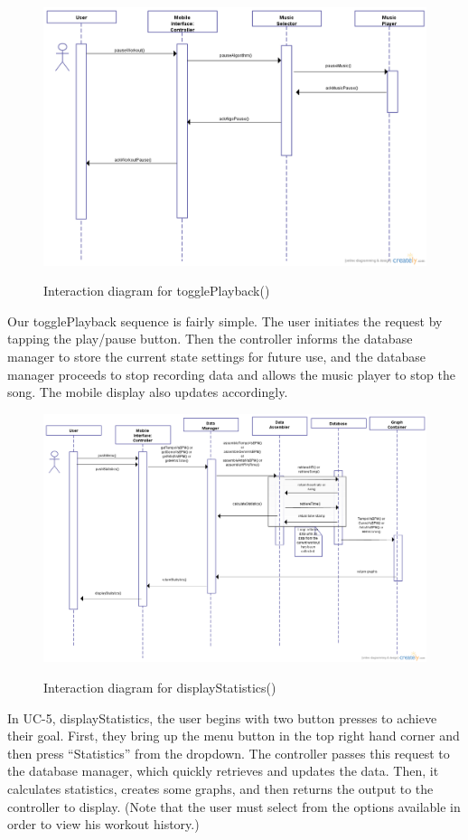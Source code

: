 \documentclass[letterpaper,english, 12pt]{scrreprt}
\begin{document}
\begin{figure}[H]
	\includegraphics[scale=.40]{img/Interaction_Diagrams/newUC4.png}\\
	\caption {Interaction diagram for togglePlayback()} 
\end{figure}

Our togglePlayback sequence is fairly simple. The user initiates the request by tapping the play/pause button. Then the controller informs the database manager to store the current state settings for future use, and the database manager proceeds to stop recording data and allows the music player to stop the song. The mobile display also updates accordingly.

\begin{figure}[H]
	\includegraphics[scale=.35]{img/Interaction_Diagrams/displayStatistics.png}\\
	\caption {Interaction diagram for displayStatistics()} 
\end{figure}
In UC-5, displayStatistics, the user begins with two button presses to achieve their goal. First, they bring up the menu button in the top right hand corner and then press ``Statistics'' from the dropdown. The controller passes this request to the database manager, which quickly retrieves and updates the data. Then, it calculates statistics, creates some graphs, and then returns the output to the controller to display. (Note that the user must select from the options available in order to view his workout history.)
\end{document}
